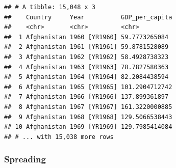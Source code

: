 \documentclass[11pt,]{article}
\newenvironment{Shaded}{\begin{snugshade}}{\end{snugshade}}
\newcommand{\KeywordTok}[1]{\textcolor[rgb]{0.13,0.29,0.53}{\textbf{#1}}}
\newcommand{\DataTypeTok}[1]{\textcolor[rgb]{0.13,0.29,0.53}{#1}}
\newcommand{\DecValTok}[1]{\textcolor[rgb]{0.00,0.00,0.81}{#1}}
\newcommand{\StringTok}[1]{\textcolor[rgb]{0.31,0.60,0.02}{#1}}
\newcommand{\CommentTok}[1]{\textcolor[rgb]{0.56,0.35,0.01}{\textit{#1}}}
\newcommand{\OperatorTok}[1]{\textcolor[rgb]{0.81,0.36,0.00}{\textbf{#1}}}
\newcommand{\NormalTok}[1]{#1}
\begin{document}
\begin{Shaded}
\end{Shaded}

\begin{verbatim}
## # A tibble: 15,048 x 3
##    Country     Year          GDP_per_capita
##    <chr>       <chr>         <chr>         
##  1 Afghanistan 1960 [YR1960] 59.7773265084 
##  2 Afghanistan 1961 [YR1961] 59.8781528089 
##  3 Afghanistan 1962 [YR1962] 58.4928738323 
##  4 Afghanistan 1963 [YR1963] 78.7827580363 
##  5 Afghanistan 1964 [YR1964] 82.2084438594 
##  6 Afghanistan 1965 [YR1965] 101.2904712742
##  7 Afghanistan 1966 [YR1966] 137.899361897 
##  8 Afghanistan 1967 [YR1967] 161.3220000885
##  9 Afghanistan 1968 [YR1968] 129.5066538443
## 10 Afghanistan 1969 [YR1969] 129.7985414084
## # ... with 15,038 more rows
\end{verbatim}

\subsubsection{Spreading}\label{spreading}
\end{document}
